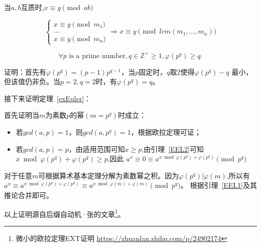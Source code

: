 \begin{inference}
	当$a,b$互质时,$x\equiv y \pmod{ab}$
\end{inference}

\begin{inference}
	\begin{displaymath}
		\left\{
		\begin{array}{l}
			x\equiv y \pmod{m_1} \\
			\ldots\\
			x\equiv y \pmod{m_n}
		\end{array}
		\right.
		\Rightarrow x\equiv y \pmod{lcm(m_1,\ldots,m_n)}
	\end{displaymath}
\end{inference}

\begin{lemma}\label{EEL2}
	\begin{displaymath}
		\forall p\textrm{ is a prime number},q\in \mathbb{Z^+}\ge 1,
		\varphi(p^q)\geq q.
	\end{displaymath}
\end{lemma}

证明：首先有$\varphi(p^q)=(p-1)p^{q-1}$，当$p$固定时，$q$取2使得$\varphi(p^q)-q$
最小，但该值仍非负。当$p=2,q=2$时，有$\varphi(p^q)=q$。

接下来证明定理~\ref{exEuler}：

首先证明当$m$为素数$p$的幂$(m=p^q)$时成立：
\begin{itemize}
	\item 若$gcd(a,p)=1$，则$gcd(a,p^q)=1$，根据欧拉定理可证；
	\item 若$gcd(a,p)=p$，由适用范围可知$x\geq p$,由引理~\ref{EEL2}可知
	$x \bmod \varphi(p^q) + \varphi(p^q) \geq p$,因此
	$a^x\equiv 0 \equiv a^{x \bmod \varphi(p^q)+\varphi(p^q)} \pmod{p^q}$
\end{itemize}

对于任意$m$可根据算术基本定理分解为素数幂之积。因为$\varphi(p^q)|\varphi(m)$,所以有
$a^x\equiv a^{x \bmod \varphi(p^q)+\varphi(p^q)}
\equiv a^{x \bmod \varphi(m)+\varphi(m)} \pmod{p^q}$。
根据引理~\ref{EEL1}及其推论合并即可。

以上证明源自后缀自动机·张的文章\footnote{微小的欧拉定理EXT证明
	\url{https://zhuanlan.zhihu.com/p/24902174}}。
